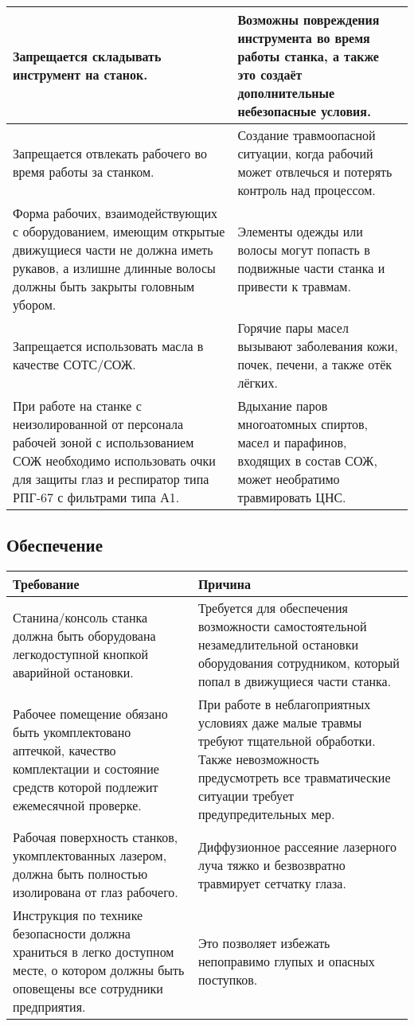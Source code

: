 \documentclass[a4paper,
	twoside,
	russian]{article}
\begin{document}
\begin{tabulary}{\linewidth}{LL}
Запрещается складывать инструмент на станок.
&
Возможны повреждения инструмента во время работы станка, а также это
создаёт дополнительные небезопасные условия.
\\ \hline
Запрещается отвлекать рабочего во время работы за станком.
&
Создание травмоопасной ситуации, когда рабочий может отвлечься и
потерять контроль над процессом.
\\ \hline
Форма рабочих, взаимодействующих с оборудованием, имеющим открытые
движущиеся части не должна иметь рукавов, а излишне длинные волосы
должны быть закрыты головным убором.
&
Элементы одежды или волосы могут попасть в подвижные части станка и
привести к травмам.
\\ \hline
Запрещается использовать масла в качестве СОТС/СОЖ.
&
Горячие пары масел вызывают заболевания кожи, почек, печени, а также
отёк лёгких.
\\ \hline
При работе на станке с неизолированной от персонала рабочей зоной с
использованием СОЖ необходимо использовать очки для защиты глаз и
респиратор типа РПГ-67 с фильтрами типа А1.
&
Вдыхание паров многоатомных спиртов, масел и парафинов, входящих в
состав СОЖ, может необратимо травмировать ЦНС.
\\ \hline
\end{tabulary}


\clearpage
\subsection{Обеспечение}

\begin{tabulary}{\linewidth}{LL}
\textbf{Требование} & \textbf{Причина} \\ \hline
Станина/консоль станка должна быть оборудована легкодоступной кнопкой
аварийной остановки.
&
Требуется для обеспечения возможности самостоятельной незамедлительной
остановки оборудования сотрудником, который попал в движущиеся части
станка.
\\ \hline
Рабочее помещение обязано быть укомплектовано аптечкой, качество
комплектации и состояние средств которой подлежит ежемесячной проверке.
&
При работе в неблагоприятных условиях даже малые травмы требуют
тщательной обработки. Также невозможность предусмотреть все
травматические ситуации требует предупредительных мер.
\\ \hline
Рабочая поверхность станков, укомплектованных лазером, должна быть
полностью изолирована от глаз рабочего.
&
Диффузионное рассеяние лазерного луча тяжко и безвозвратно травмирует
сетчатку глаза.
\\ \hline
Инструкция по технике безопасности должна храниться в легко доступном
месте, о котором должны быть оповещены все сотрудники предприятия.
&
Это позволяет избежать непоправимо глупых и опасных поступков.
\\ \hline
\end{tabulary}
\end{document}
